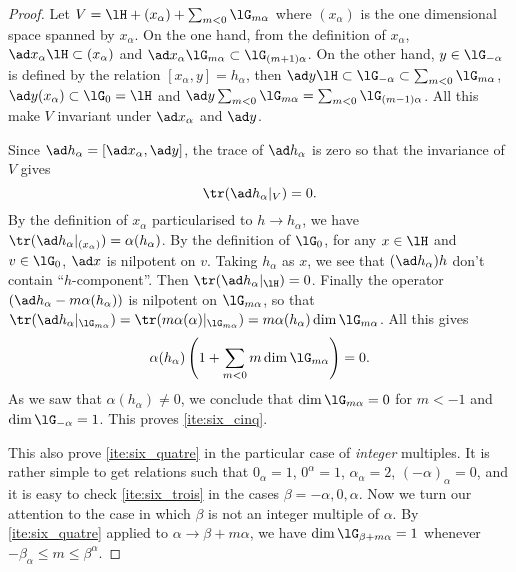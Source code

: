 \begin{proof}
Let $V=\lH+(x_{\alpha})+\sum_{m<0}\lG_{m\alpha}$ where $(x_{\alpha})$ is the one dimensional space spanned by $x_{\alpha}$. On the one hand,  from the definition of $x_{\alpha}$, $\ad x_{\alpha}\lH\subset(x_{\alpha})$ and $\ad x_{\alpha}\lG_{m\alpha}\subset\lG_{(m+1)\alpha}$. On the other hand, $y\in\lG_{-\alpha}$ is defined by the relation $[x_{\alpha},y]=h_{\alpha}$, then  $\ad y\lH\subset\lG_{-\alpha}\subset\sum_{m<0}\lG_{m\alpha}$, $\ad y(x_{\alpha})\subset\lG_0=\lH$ and $\ad y\sum_{m<0}\lG_{m\alpha}=\sum_{m<0}\lG_{(m-1)\alpha}$. All this make $V$ invariant under $\ad x_{\alpha}$ and $\ad y$. 

Since $\ad h_{\alpha}=[\ad x_{\alpha},\ad y]$, the trace of $\ad h_{\alpha}$ is zero so that the invariance of $V$ gives
\[
\tr(\ad h_{\alpha}|_V)=0.
\]
By the definition of $x_{\alpha}$ particularised to $h\to h_{\alpha}$, we have $\tr(\ad h_{\alpha}|_{(x_{\alpha})})=\alpha(h_{\alpha})$. By the definition of $\lG_0$, for any $x\in\lH$ and $v\in\lG_0$, $\ad x$ is nilpotent on $v$. Taking $h_{\alpha}$ as $x$, we see that 
$(\ad h_{\alpha})h$ don't contain ``$h$-component''. Then $\tr(\ad h_{\alpha}|_{\lH})=0$. Finally the operator $(\ad h_{\alpha}-m\alpha(h_{\alpha}))$ is nilpotent on $\lG_{m\alpha}$, so that $\tr(\ad h_{\alpha}|_{\lG_{m\alpha}})=\tr( m\alpha(\alpha)|_{\lG_{m\alpha}} )=m\alpha(h_{\alpha})\dim\lG_{m\alpha}$. All this gives
\begin{equation}
\alpha(h_{\alpha})\left( 1+\sum_{m<0}m\dim\lG_{m\alpha}  \right)=0.
\end{equation}
As we saw that $\alpha(h_{\alpha})\neq 0$, we conclude that $\dim\lG_{m\alpha}=0$ for $m<-1$ and $\dim\lG_{-\alpha}=1$. This proves \ref{ite:six_cinq}. 

This also prove \ref{ite:six_quatre} in the particular case of \emph{integer} multiples. It is rather simple to get relations such that $0_{\alpha}=1$, $0^{\alpha}=1$, $\alpha_{\alpha}=2$, $(-\alpha)_{\alpha}=0$, and it is easy to check \ref{ite:six_trois} in the cases $\beta=-\alpha,0,\alpha$. Now we turn our attention to the case in which $\beta$ is not an integer multiple of $\alpha$. By \ref{ite:six_quatre} applied to $\alpha\to\beta+m\alpha$, we have $\dim\lG_{\beta+m\alpha}=1$ whenever $-\beta_{\alpha}\leq m\leq\beta^{\alpha}$.


\end{proof}
